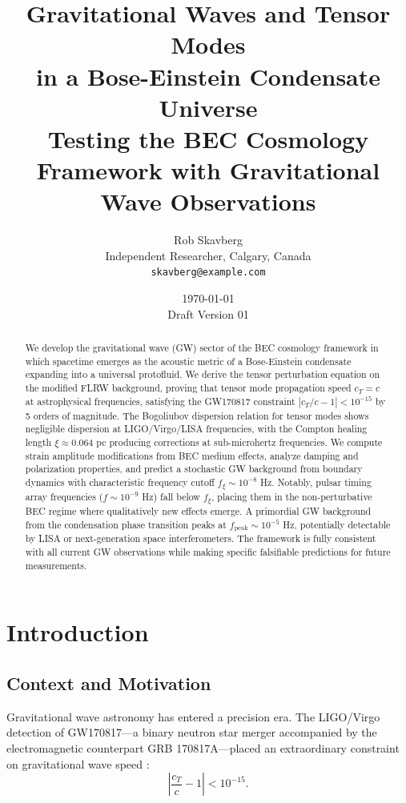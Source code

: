\documentclass[11pt,a4paper]{article}
\title{\textbf{Gravitational Waves and Tensor Modes\\in a Bose-Einstein Condensate Universe}\\[0.5em]
\large Testing the BEC Cosmology Framework with Gravitational Wave Observations}
\author{Rob Skavberg\\[0.3em]
\small Independent Researcher, Calgary, Canada\\
\small \texttt{skavberg@example.com}}
\date{\today\\[0.5em]
\small Draft Version 01}
\newcommand{\cT}{\ensuremath{c_T}}
\theoremstyle{definition}
\theoremstyle{remark}
\begin{document}
\maketitle

\begin{abstract}
We develop the gravitational wave (GW) sector of the BEC cosmology framework in which spacetime emerges as the acoustic metric of a Bose-Einstein condensate expanding into a universal protofluid. We derive the tensor perturbation equation on the modified FLRW background, proving that tensor mode propagation speed $\cT = c$ at astrophysical frequencies, satisfying the GW170817 constraint $|\cT/c - 1| < 10^{-15}$ by 5 orders of magnitude. The Bogoliubov dispersion relation for tensor modes shows negligible dispersion at LIGO/Virgo/LISA frequencies, with the Compton healing length $\xi \approx 0.064$ pc producing corrections at sub-microhertz frequencies. We compute strain amplitude modifications from BEC medium effects, analyze damping and polarization properties, and predict a stochastic GW background from boundary dynamics with characteristic frequency cutoff $f_\xi \sim 10^{-8}$ Hz. Notably, pulsar timing array frequencies ($f \sim 10^{-9}$ Hz) fall below $f_\xi$, placing them in the non-perturbative BEC regime where qualitatively new effects emerge. A primordial GW background from the condensation phase transition peaks at $f_{\mathrm{peak}} \sim 10^{-5}$ Hz, potentially detectable by LISA or next-generation space interferometers. The framework is fully consistent with all current GW observations while making specific falsifiable predictions for future measurements.
\end{abstract}

\tableofcontents
\newpage

\section{Introduction}
\label{sec:introduction}

\subsection{Context and Motivation}
\label{sec:context}

Gravitational wave astronomy has entered a precision era. The LIGO/Virgo detection of GW170817---a binary neutron star merger accompanied by the electromagnetic counterpart GRB 170817A---placed an extraordinary constraint on gravitational wave speed \cite{Abbott2017,Abbott2017GRB}:
\begin{equation}
\label{eq:gw170817_constraint}
\left|\frac{\cT}{c} - 1\right| < 10^{-15}.
\end{equation}
\end{document}
